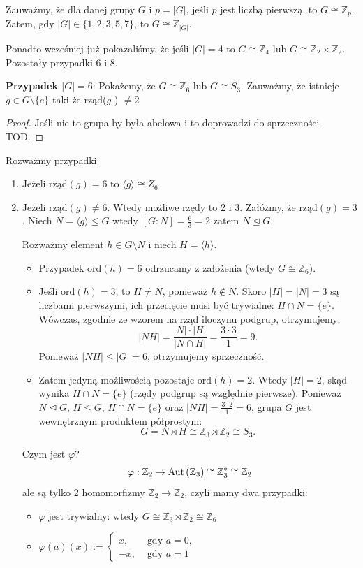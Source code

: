 Zauważmy, że dla danej grupy $G$ i $p = \left| G \right|$, jeśli $p$ jest liczbą pierwszą, to $G\cong\mathbb{Z}_{p}$. Zatem, gdy $\left| G \right| \in \{1,2,3,5,7\} $, to $G\cong\mathbb{Z}_{\left| G \right| }$.

Ponadto wcześniej już pokazaliśmy, że jeśli $\left| G \right| = 4$ to $G\cong\mathbb{Z}_{4}$ lub $G\cong \mathbb{Z}_2\times \mathbb{Z}_2$. Pozostały przypadki 6 i 8.

\noindent \textbf{Przypadek $\left| G \right| = 6$}: Pokażemy, że $G\cong\mathbb{Z}_6$ lub $G\cong S_{3}$.
Zauważmy, że istnieje $g\in G\setminus \{e\} $ taki że rząd($g$ ) $\neq 2$
\begin{proof}
	Jeśli nie to grupa by była abelowa i to doprowadzi do sprzeczności TOD. 
\end{proof} 
Rozważmy przypadki
\begin{enumerate}[label=\arabic*.]
	\item Jeżeli $\text{rząd}\left( g \right) = 6$ to $\langle g \rangle \cong Z_{6}$ 
	\item Jeżeli $\text{rząd}\left( g \right) \neq 6$. Wtedy możliwe rzędy to 2 i 3. Załóżmy, że $\text{rząd}\left( g \right) = 3$.
		Niech $N= \langle g \rangle \le G$ wtedy $[G:N] = \frac{6}{3}=2$ zatem $N\unlhd G.$ 

		Rozważmy element $h \in G \setminus N$ i niech $H = \langle h \rangle$.
		\begin{itemize}
    			\item Przypadek $\text{ord}(h) = 6$ odrzucamy z założenia (wtedy $G \cong \mathbb{Z}_6$).
    			\item Jeśli $\text{ord}(h) = 3$, to $H \neq N$, ponieważ $h \notin N$. Skoro $|H| = |N| = 3$ są liczbami pierwszymi, ich przecięcie musi być trywialne: $H \cap N = \{e\}$. Wówczas, zgodnie ze wzorem na rząd iloczynu podgrup, otrzymujemy:
   			 	$$|NH| = \frac{|N| \cdot |H|}{|N \cap H|} = \frac{3 \cdot 3}{1} = 9.$$
    				Ponieważ $|NH| \le |G| = 6$, otrzymujemy sprzeczność. 
    			\item Zatem jedyną możliwością pozostaje $\text{ord}(h) = 2$. Wtedy $|H| = 2$, skąd wynika $H \cap N = \{e\}$ (rzędy podgrup są względnie pierwsze). Ponieważ $N \unlhd G$, $H \le G$, $H \cap N = \{e\}$ oraz $|NH| = \frac{3 \cdot 2}{1} = 6$, grupa $G$ jest wewnętrznym produktem półprostym:
  				  $$G = N \rtimes H \cong \mathbb{Z}_3 \rtimes \mathbb{Z}_2 \cong S_3.$$
		\end{itemize}


		Czym jest $\varphi$? \[
		\varphi : \mathbb{Z}_2 \to \operatorname{Aut}\left(\mathbb{Z}_3\right) \cong \mathbb{Z}_3^{*} \cong \mathbb{Z}_2
		\] 
                ale są tylko 2 homomorfizmy $\mathbb{Z}_2\to \mathbb{Z}_2$, czyli mamy dwa przypadki:
		\begin{itemize}
			\item $\varphi $ jest trywialny: wtedy $G\cong \mathbb{Z}_3\rtimes\mathbb{Z}_2 \cong\mathbb{Z}_6$
			\item $\varphi\left( a \right) \left( x \right) := \begin{cases}
					x, &\text{ gdy } a= 0,\\
					-x, &\text{ gdy } a=1
			\end{cases}$ 


\end{itemize}
\end{enumerate}
